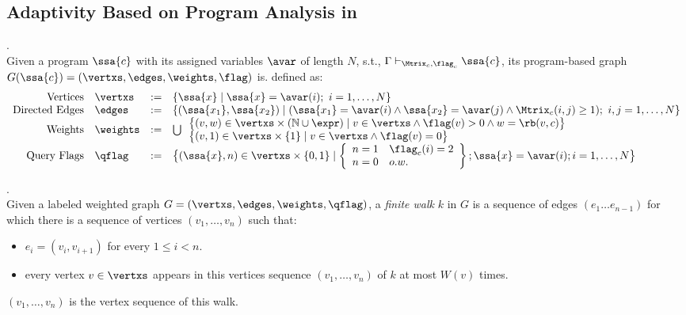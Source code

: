 \subsection{Adaptivity Based on Program Analysis in \THESYSTEM}
%
 \begin{defn}
.
\label{def:prog-based_graph}
\\
Given a program $\ssa{c}$ with its assigned variables $\avar$ of length $N$, s.t.,
$\Gamma \vdash_{\Mtrix_c, \flag_c} \ssa{c}$, 
its program-based graph 
$G(\ssa{c}) = (\vertxs, \edges, \weights, \flag)$ is. defined as:
\\
\[
\begin{array}{rlcl}
	\text{Vertices} &
	\vertxs & := & \left\{ 
	\ssa{x} \mid
	\ssa{x} = \avar(i); ~ i = 1, \ldots, N
	\right\}
	\\
	\text{Directed Edges} &
	\edges & := & 
	\left\{ 
	(\ssa{x_1}, \ssa{x_2}) 
	\mid
		(\ssa{x_1} = \avar(i) \land \ssa{x_2} = \avar(j) \land
		\Mtrix_c(i, j) \geq 1); ~ i,j = 1, \ldots, N
	\right\}
	\\
	\text{Weights} &
	\weights & := &
	\bigcup
	\begin{array}{l}
		\big\{ (v, w) \in \vertxs \times (\mathbb{N} \cup \expr)
		\mid
		v \in \vertxs \land \flag(v) > 0 \land w = \rb(v, c)
		\big\} 
		\\
		\big\{(v, 1)  \in \vertxs \times \{1\} 
		\mid
		v \in \vertxs \land \flag(v) = 0
		\big\}
	\end{array} 
	\\
	\text{Query Flags} &
	\qflag & := & 
	\big\{(\ssa{x}, n)  \in \vertxs \times \{0, 1\} 
	\mid 
	\left\{
	\begin{array} {ll}
	n = 1 & \flag_c(i) = 2
	\\  
	n = 0 & o.w.
	\end{array}
	\right\};
	\ssa{x} = \avar(i); i = 1, \ldots, N
	\big\}
\end{array}
\]
\end{defn} 
%
\begin{defn}.
\\
Given a labeled weighted graph $G = (\vertxs, \edges, \weights, \qflag)$, a \emph{finite walk} $k$ in $G$ is a sequence of edges $(e_1 \ldots e_{n - 1})$ 
for which there is a sequence of vertices $(v_1, \ldots, v_{n})$ such that:
\begin{itemize}
    \item $e_i = (v_{i},v_{i + 1})$ for every $1 \leq i < n$.
    \item every vertex $v \in \vertxs$ appears in this vertices sequence $(v_1, \ldots, v_{n})$ of $k$ at most $W(v)$ times.  
\end{itemize}
$(v_1, \ldots, v_{n})$ is the vertex sequence of this walk.
\\
\end{defn}


